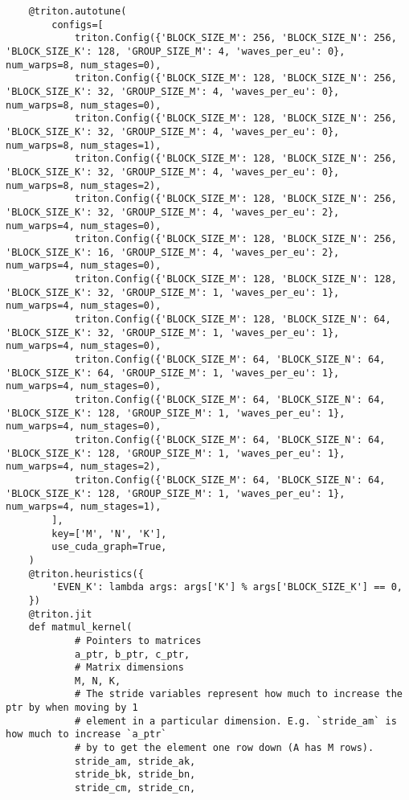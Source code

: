 \documentclass{article}
\begin{document}
\begin{lstlisting}
    @triton.autotune(
        configs=[
            triton.Config({'BLOCK_SIZE_M': 256, 'BLOCK_SIZE_N': 256, 'BLOCK_SIZE_K': 128, 'GROUP_SIZE_M': 4, 'waves_per_eu': 0}, num_warps=8, num_stages=0),
            triton.Config({'BLOCK_SIZE_M': 128, 'BLOCK_SIZE_N': 256, 'BLOCK_SIZE_K': 32, 'GROUP_SIZE_M': 4, 'waves_per_eu': 0}, num_warps=8, num_stages=0),
            triton.Config({'BLOCK_SIZE_M': 128, 'BLOCK_SIZE_N': 256, 'BLOCK_SIZE_K': 32, 'GROUP_SIZE_M': 4, 'waves_per_eu': 0}, num_warps=8, num_stages=1),
            triton.Config({'BLOCK_SIZE_M': 128, 'BLOCK_SIZE_N': 256, 'BLOCK_SIZE_K': 32, 'GROUP_SIZE_M': 4, 'waves_per_eu': 0}, num_warps=8, num_stages=2),
            triton.Config({'BLOCK_SIZE_M': 128, 'BLOCK_SIZE_N': 256, 'BLOCK_SIZE_K': 32, 'GROUP_SIZE_M': 4, 'waves_per_eu': 2}, num_warps=4, num_stages=0),
            triton.Config({'BLOCK_SIZE_M': 128, 'BLOCK_SIZE_N': 256, 'BLOCK_SIZE_K': 16, 'GROUP_SIZE_M': 4, 'waves_per_eu': 2}, num_warps=4, num_stages=0),
            triton.Config({'BLOCK_SIZE_M': 128, 'BLOCK_SIZE_N': 128, 'BLOCK_SIZE_K': 32, 'GROUP_SIZE_M': 1, 'waves_per_eu': 1}, num_warps=4, num_stages=0),
            triton.Config({'BLOCK_SIZE_M': 128, 'BLOCK_SIZE_N': 64, 'BLOCK_SIZE_K': 32, 'GROUP_SIZE_M': 1, 'waves_per_eu': 1}, num_warps=4, num_stages=0),
            triton.Config({'BLOCK_SIZE_M': 64, 'BLOCK_SIZE_N': 64, 'BLOCK_SIZE_K': 64, 'GROUP_SIZE_M': 1, 'waves_per_eu': 1}, num_warps=4, num_stages=0),
            triton.Config({'BLOCK_SIZE_M': 64, 'BLOCK_SIZE_N': 64, 'BLOCK_SIZE_K': 128, 'GROUP_SIZE_M': 1, 'waves_per_eu': 1}, num_warps=4, num_stages=0),
            triton.Config({'BLOCK_SIZE_M': 64, 'BLOCK_SIZE_N': 64, 'BLOCK_SIZE_K': 128, 'GROUP_SIZE_M': 1, 'waves_per_eu': 1}, num_warps=4, num_stages=2),
            triton.Config({'BLOCK_SIZE_M': 64, 'BLOCK_SIZE_N': 64, 'BLOCK_SIZE_K': 128, 'GROUP_SIZE_M': 1, 'waves_per_eu': 1}, num_warps=4, num_stages=1),
        ],
        key=['M', 'N', 'K'],
        use_cuda_graph=True,
    )
    @triton.heuristics({
        'EVEN_K': lambda args: args['K'] % args['BLOCK_SIZE_K'] == 0,
    })
    @triton.jit
    def matmul_kernel(
            # Pointers to matrices
            a_ptr, b_ptr, c_ptr,
            # Matrix dimensions
            M, N, K,
            # The stride variables represent how much to increase the ptr by when moving by 1
            # element in a particular dimension. E.g. `stride_am` is how much to increase `a_ptr`
            # by to get the element one row down (A has M rows).
            stride_am, stride_ak,
            stride_bk, stride_bn,
            stride_cm, stride_cn,

\end{lstlisting}
\end{document}
